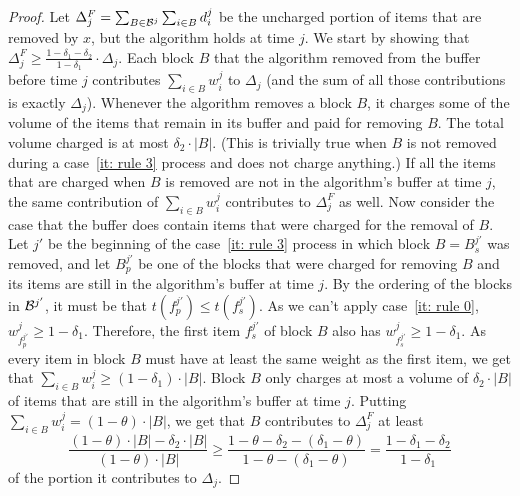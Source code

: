 \documentclass[11pt]{article}
\begin{document}
\begin{proof}
Let $\Delta_j^F = \sum_{B\in {\cal B}^j}\sum_{i\in B} d^j_i$ be
the uncharged portion of items that are removed by $x$, but the algorithm holds
at time $j$. We start by showing that $\Delta_j^F \geq
\frac{1-\delta_1-\delta_2}{1-\delta_1} \cdot \Delta_j$.
Each block $B$ that the algorithm removed from the buffer
before time $j$ contributes $\sum_{i\in B} w^j_i$ to $\Delta_j$
(and the sum of all those contributions is exactly $\Delta_j$).
Whenever the algorithm removes a block $B$,
it charges some of the volume of
the items that remain in its buffer and paid for removing $B$.
The total volume charged is at most $\delta_2\cdot |B|$.
(This is trivially true when $B$ is not removed during a
case~\ref{it: rule 3} process and does not charge anything.)
If all the items that are charged when $B$ is removed
are not in the algorithm's buffer at time $j$,
the same contribution of $\sum_{i\in B} w^j_i$ contributes
to $\Delta_j^F$ as well. Now consider the case that the
buffer does contain items that were charged
for the removal of $B$. Let $j'$ be the beginning
of the case~\ref{it: rule 3} process in which
block $B = B^{j'}_s$ was removed,
and let $B^{j'}_{p}$ be one of the blocks that
were charged for removing $B$ and its items
are still in the algorithm's buffer at time $j$.
By the ordering of the blocks in ${\cal B}^{j'}$, it must
be that $t(f^{j'}_{p}) \leq t(f^{j'}_{s})$. As we can't apply
case~\ref{it: rule 0}, $w^j_{f^{j'}_{p}}\geq 1-\delta_1$.
Therefore, the first item $f^{j'}_{s}$ of block $B$ also has
$w^j_{f^{j'}_{s}}\geq 1-\delta_1$.
As every item in block $B$ must have at least the same weight
as the first item,
we get that $\sum_{i\in B} w^j_i
\geq (1-\delta_1)\cdot|B|$. Block $B$ only charges at most a
volume of $\delta_2\cdot |B|$ of items that are still in
the algorithm's buffer at time $j$.
Putting $\sum_{i\in B} w^j_i = (1-\theta)\cdot|B|$, we get that $B$
contributes to $\Delta_j^F$ at least
$$\frac {(1-\theta)\cdot|B|-\delta_2\cdot |B|}{(1-\theta)\cdot|B|}
\geq \frac {1-\theta-\delta_2 - (\delta_1-\theta)}{1-\theta- (\delta_1-\theta)}
= \frac {1-\delta_1-\delta_2}{1-\delta_1}
$$
of the portion it contributes to $\Delta_j$.


\end{proof}
\end{document}

